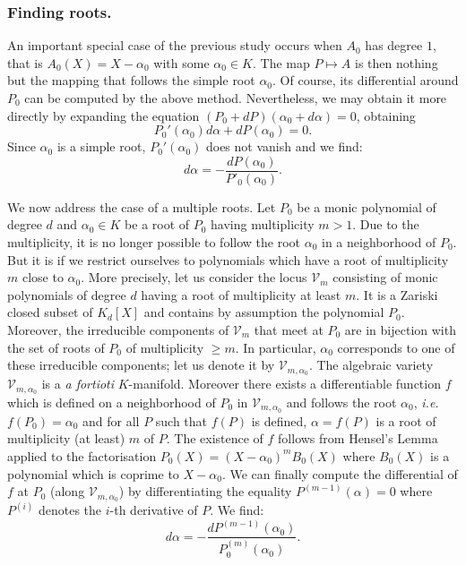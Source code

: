 \documentclass{lms}
\begin{document}
\subsubsection*{Finding roots.}

An important special case of the previous study occurs when $A_0$ has 
degree $1$, that is $A_0(X) = X - \alpha_0$ with some $\alpha_0 \in K$. 
The map $P \mapsto A$ is then nothing but the mapping that 
follows the simple root $\alpha_0$. Of course, its differential around 
$P_0$ can be computed by the above method. Nevertheless, we may
obtain it more directly by expanding the equation $(P_0 + 
dP)(\alpha_0 + d\alpha) = 0$, obtaining
\[
P_0'(\alpha_0) d\alpha + dP(\alpha_0) = 0.
\]
Since $\alpha_0$ is a simple root, $P_0'(\alpha_0)$ 
does not vanish and we find:
$$d \alpha = - \frac{dP(\alpha_0)}{P'_0(\alpha_0)}.$$

We now address the case of a multiple roots. Let $P_0$ be a monic 
polynomial of degree $d$ and $\alpha_0 \in K$ be a root of $P_0$ having 
multiplicity $m > 1$. Due to the multiplicity, it is no longer possible 
to follow the root $\alpha_0$ in a neighborhood of $P_0$. But it is if we 
restrict ourselves to polynomials which have a root of multiplicity $m$ 
close to $\alpha_0$. More precisely, let us consider the locus $\mathcal 
V_m$ consisting of monic polynomials of degree $d$ having a root of 
multiplicity at least $m$. It is a Zariski closed subset of $K_d[X]$ and
contains by assumption the polynomial $P_0$. 
Moreover, the irreducible components of $\mathcal V_m$ that meet at 
$P_0$ are in bijection with the set of roots of $P_0$ of multiplicity 
$\geq m$. In particular, $\alpha_0$ corresponds to one of these 
irreducible components; let us denote it by $\mathcal V_{m,\alpha_0}$. 
The algebraic variety $\mathcal V_{m,\alpha_0}$ is a \emph{a fortioti} 
$K$-manifold. Moreover there exists a differentiable function $f$ which 
is defined on a neighborhood of $P_0$ in $\mathcal V_{m,\alpha_0}$ and 
follows the root $\alpha_0$, \emph{i.e.} $f(P_0) = \alpha_0$ and for all 
$P$ such that $f(P)$ is defined, $\alpha = f(P)$ is a root of 
multiplicity (at least) $m$ of $P$. The existence of $f$ follows from 
Hensel's Lemma applied to the factorisation $P_0(X) = (X-\alpha_0)^m 
B_0(X)$ where $B_0(X)$ is a polynomial which is coprime to $X - 
\alpha_0$. We can finally compute the differential of $f$ at $P_0$ 
(along $\mathcal V_{m,\alpha_0}$) by differentiating the equality
$P^{(m-1)}(\alpha) = 0$ where $P^{(i)}$ denotes the $i$-th derivative
of $P$. We find:
\begin{equation}
\label{eq:dalphamult}
d \alpha = - \frac{dP^{(m-1)}(\alpha_0)}{P_0^{(m)}(\alpha_0)}.
\end{equation}
\end{document}
